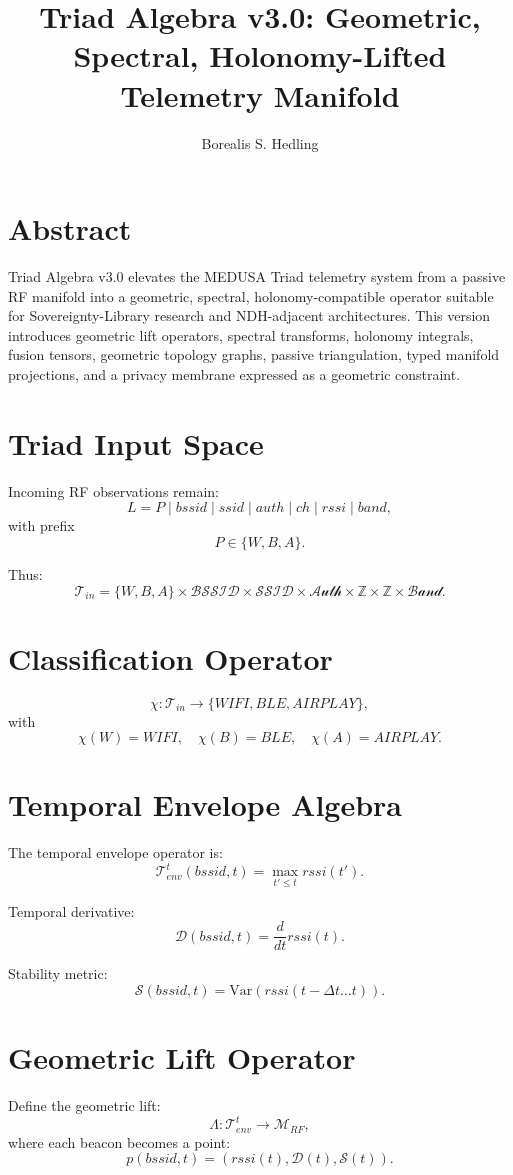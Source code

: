 \documentclass[11pt]{article}
\title{Triad Algebra v3.0: Geometric, Spectral, Holonomy-Lifted Telemetry Manifold}
\author{Borealis S. Hedling}
\date{}
\begin{document}
\maketitle

\section*{Abstract}
Triad Algebra v3.0 elevates the MEDUSA Triad telemetry system from a passive RF
manifold into a geometric, spectral, holonomy-compatible operator suitable for
Sovereignty-Library research and NDH-adjacent architectures. This version introduces
geometric lift operators, spectral transforms, holonomy integrals, fusion tensors,
geometric topology graphs, passive triangulation, typed manifold projections, and a
privacy membrane expressed as a geometric constraint.

\section{Triad Input Space}
Incoming RF observations remain:
\[
L = P \mid bssid \mid ssid \mid auth \mid ch \mid rssi \mid band,
\]
with prefix
\[
P \in \{W, B, A\}.
\]

Thus:
\[
\mathcal{T}_{in}
= \{W,B,A\}
\times \mathcal{BSSID}
\times \mathcal{SSID}
\times \mathcal{Auth}
\times \mathbb{Z}
\times \mathbb{Z}
\times \mathcal{Band}.
\]

\section{Classification Operator}
\[
\chi : \mathcal{T}_{in} \to \{WIFI, BLE, AIRPLAY\},
\]
with
\[
\chi(W)=WIFI,\quad
\chi(B)=BLE,\quad
\chi(A)=AIRPLAY.
\]

\section{Temporal Envelope Algebra}
The temporal envelope operator is:
\[
\mathcal{T}_{env}^{t}(bssid,t)
= \max_{t' \le t} rssi(t').
\]

Temporal derivative:
\[
\mathcal{D}(bssid,t) = \frac{d}{dt} rssi(t).
\]

Stability metric:
\[
\mathcal{S}(bssid,t) = \mathrm{Var}(rssi(t-\Delta t \ldots t)).
\]

\section{Geometric Lift Operator}
Define the geometric lift:
\[
\Lambda : \mathcal{T}_{env}^{t} \to \mathcal{M}_{RF},
\]
where each beacon becomes a point:
\[
p(bssid,t) = (rssi(t), \mathcal{D}(t), \mathcal{S}(t)).
\]
\end{document}
